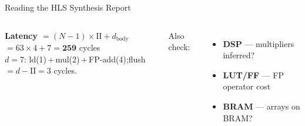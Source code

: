 \documentclass[aspectratio=169,12pt]{beamer}
\begin{document}
\begin{frame}{Reading the HLS Synthesis Report}
\begin{columns}[T,totalwidth=\textwidth]
  \vspace{0.08cm}
  \colorbox{Teal!10}{\parbox{\dimexpr\linewidth-2\fboxsep\relax}{\vspace{3pt}
    {\color{Teal}\bfseries Latency $= (N{-}1)\times\mathrm{II} + d_{\mathrm{body}}$}\\
    {\small $= 63\times 4 + 7 = \mathbf{259}$ cycles\quad\checkmark}\\
    {\footnotesize $d{=}7$: ld(1)\,+\,mul(2)\,+\,\mbox{FP-add(4)};\enspace flush $= d{-}\mathrm{II} = 3$ cycles.}
  \vspace{3pt}}}

  \vspace{0.08cm}
  {\small\color{Navy}Also check:
  \begin{itemize}\setlength{\itemsep}{0pt}\setlength{\topsep}{2pt}
    \item \textbf{DSP} — multipliers inferred?
    \item \textbf{LUT/FF} — FP operator cost
    \item \textbf{BRAM} — arrays on BRAM?
  \end{itemize}}

\end{columns}
\end{frame}
\end{document}
